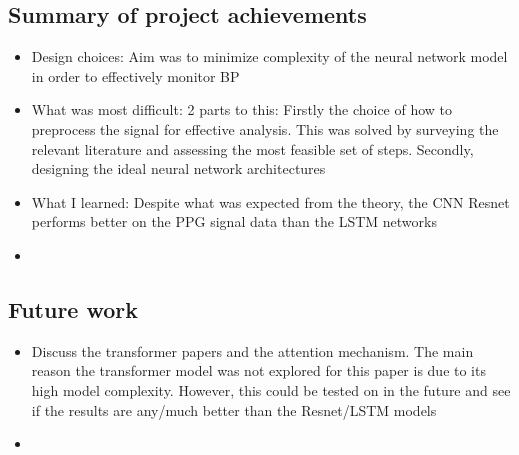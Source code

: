 \subsection{Summary of project achievements}

\begin{itemize}
    \item Design choices: Aim was to minimize complexity of the neural network model in order to effectively monitor BP 
    \item What was most difficult: 2 parts to this: Firstly the choice of how to preprocess the signal for effective analysis. This was solved by surveying the relevant literature 
    and assessing the most feasible set of steps. Secondly, designing the ideal neural network architectures 
    \item What I learned: Despite what was expected from the theory, the CNN Resnet performs better on the PPG signal data than the LSTM networks
    \item 
\end{itemize}

\subsection{Future work}

\begin{itemize}
    \item Discuss the transformer papers and the attention mechanism. The main reason the transformer model was not explored for this paper is due to its high model complexity. However, this could be tested on in the future and see if the results are any/much better than the Resnet/LSTM models
    \item 
\end{itemize}